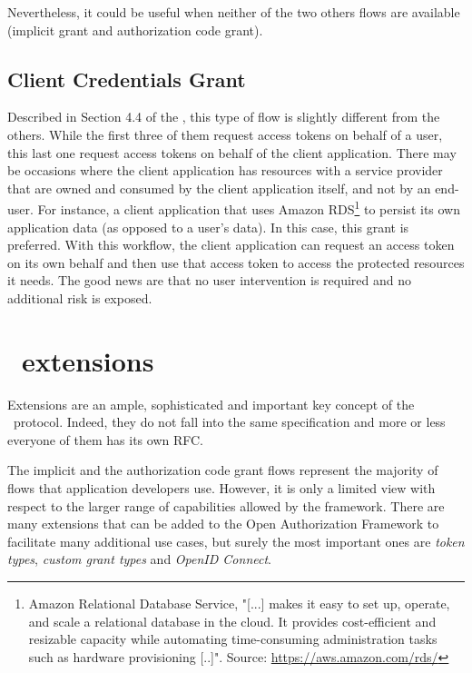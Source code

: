 Nevertheless, it could be useful when neither of the two others flows are available (implicit grant and authorization code grant).

\subsection{Client Credentials Grant}
Described in Section 4.4 of the , this type of flow is slightly different from the others. While the first three of them request access tokens on behalf of a user, this last one request access tokens on behalf of the client application. There may be occasions where the client application has resources with a service provider that are owned and consumed by the client application itself, and not by an end-user. For instance, a client application that uses Amazon RDS\footnote{Amazon Relational Database Service, "[...] makes it easy to set up, operate, and scale a relational database in the cloud. It provides cost-efficient and resizable capacity while automating time-consuming administration tasks such as hardware provisioning [..]". Source: \url{https://aws.amazon.com/rds/}} to persist its own application data (as opposed to a user's data). In this case, this grant is preferred. With this workflow, the client application can request an access token on its own behalf and then use that access token to access the protected resources it needs. The good news are that no user intervention is required and no additional risk is exposed.

\section{\oauth\ extensions}
Extensions are an ample, sophisticated and important key concept of the \oauth\ protocol. Indeed, they do not fall into the same specification and more or less everyone of them has its own RFC.

The implicit and the authorization code grant flows represent the majority of flows that application developers use. However, it is only a limited view with respect to the larger range of capabilities allowed by the framework. There are many extensions that can be added to the Open Authorization Framework to facilitate many additional use cases, but surely the most important ones are \textit{token types}, \textit{custom grant types} and \textit{OpenID Connect}.

